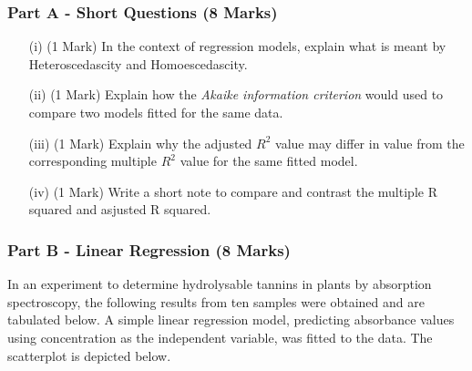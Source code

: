 \documentclass[a4paper,12pt]{article}
\begin{document}
\subsubsection*{Part A - Short Questions (8 Marks)}	
	\begin{itemize}
		\item[(i)] (1 Mark) In the context of regression models, explain what is meant by Heteroscedascity and Homoescedascity.
		
		
		\item[(ii)] (1 Mark)  Explain how the \emph{Akaike information criterion} would used to compare two models fitted for the same data.
		\item[(iii)] (1 Mark) Explain why the adjusted $R^2$ value may differ in value from the corresponding multiple $R^2$ value for the same fitted model.
		\item[(iv)] (1 Mark) Write a short note to compare and contrast the multiple R squared and asjusted R squared.
		
	\end{itemize}
\subsubsection*{Part B - Linear Regression (8 Marks)}
In an experiment to determine hydrolysable tannins in plants by absorption spectroscopy, the following results from ten samples were obtained and are tabulated below. A simple linear regression model, predicting absorbance values using concentration as the independent variable, was fitted to the data. The scatterplot is depicted below.
\end{document}
